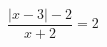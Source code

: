 \begin{ex}[type=equation]
	\begin{condition}
		$\dfrac{\big | x -3\big| - 2}{x + 2} = 2$
	\end{condition}
	\answer{$\left\{-1\right\}$}
\end{ex}